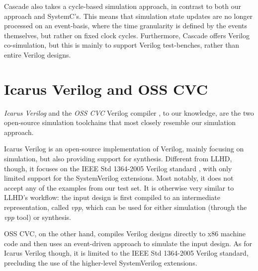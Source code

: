 Cascade also takes a cycle-based simulation approach, in contrast to both our approach and SystemC's. This means that simulation state updates are no longer processed on an event-basis, where the time granularity is defined by the events themselves, but rather on fixed clock cycles. Furthermore, Cascade offers Verilog co-simulation, but this is mainly to support Verilog test-benches, rather than entire Verilog designs.


\section{Icarus Verilog and OSS CVC}
\textit{Icarus Verilog} \cite{icarus} and the \textit{OSS CVC} Verilog compiler \cite{Meyer2016}, to our knowledge, are the two open-source simulation toolchains that most closely resemble our simulation approach.

Icarus Verilog is an open-source implementation of Verilog, mainly focusing on simulation, but also providing support for synthesis. Different from LLHD, though, it focuses on the IEEE Std 1364-2005 Verilog standard \cite{V2006}, with only limited support for the SystemVerilog extensions. Most notably, it does not accept any of the examples from our test set. It is otherwise very similar to LLHD's workflow: the input design is first compiled to an intermediate representation, called \textit{vpp}, which can be used for either simulation (through the \textit{vpp} tool) or synthesis.

OSS CVC, on the other hand, compiles Verilog designs directly to x86 machine code and then uses an event-driven approach to simulate the input design. As for Icarus Verilog though, it is limited to the IEEE Std 1364-2005 Verilog standard, precluding the use of the higher-level SystemVerilog extensions.
